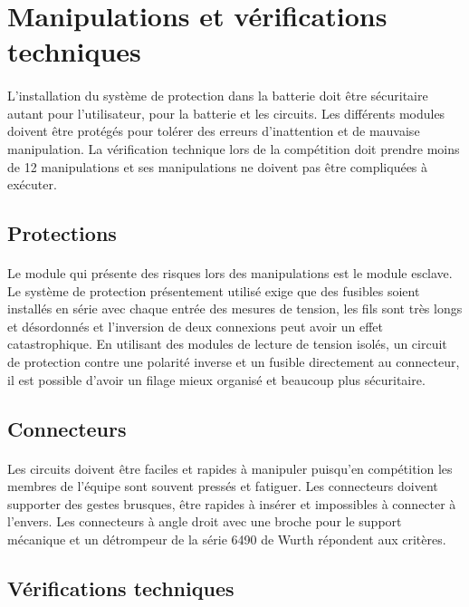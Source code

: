 \section{Manipulations et vérifications techniques}
\paragraph*{}
L'installation du système de protection dans la batterie doit être sécuritaire autant pour l'utilisateur, pour la batterie et les circuits. Les différents modules doivent être protégés pour tolérer des erreurs d'inattention et de mauvaise manipulation. La vérification technique lors de la compétition doit prendre moins de 12 manipulations et ses manipulations ne doivent pas être compliquées à exécuter.

	\subsection{Protections}
	\paragraph*{}
	Le module qui présente des risques lors des manipulations est le module esclave. Le système de protection présentement utilisé exige que des fusibles soient installés en série avec chaque entrée des mesures de tension, les fils sont très longs et désordonnés et l'inversion de deux connexions peut avoir un effet catastrophique. En utilisant des modules de lecture de tension isolés, un circuit de protection contre une polarité inverse et un fusible directement au connecteur, il est possible d'avoir un filage mieux organisé et beaucoup plus sécuritaire. 
	
	\subsection{Connecteurs}
	\paragraph*{}
	Les circuits doivent être faciles et rapides à manipuler puisqu'en compétition les membres de l'équipe sont souvent pressés et fatiguer. Les connecteurs doivent supporter des gestes brusques, être rapides à insérer et impossibles à connecter à l'envers. Les connecteurs à angle droit avec une broche pour le support mécanique et un détrompeur de la série 6490 de Wurth répondent aux critères. 
	
	\subsection{Vérifications techniques}
